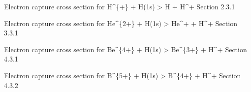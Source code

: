 \documentclass[letterpaper,10pt,english]{sphinxmanual}
\begin{document}

\begin{fulllineitems}
\label{\detokenize{aurora:aurora.janev_smith_rates.js_sigma_cx_n1_q1}}
Electron capture cross section for
H\textasciicircum{}\{+\} + H(1s) \textendash{}\textgreater{} H + H\textasciicircum{}+
Section 2.3.1

\end{fulllineitems}


\begin{fulllineitems}
\label{\detokenize{aurora:aurora.janev_smith_rates.js_sigma_cx_n1_q2}}
Electron capture cross section for
He\textasciicircum{}\{2+\} + H(1s) \textendash{}\textgreater{} He\textasciicircum{}+ + H\textasciicircum{}+
Section 3.3.1

\end{fulllineitems}


\begin{fulllineitems}
\label{\detokenize{aurora:aurora.janev_smith_rates.js_sigma_cx_n1_q4}}
Electron capture cross section for
Be\textasciicircum{}\{4+\} + H(1s) \textendash{}\textgreater{} Be\textasciicircum{}\{3+\} + H\textasciicircum{}+
Section 4.3.1

\end{fulllineitems}


\begin{fulllineitems}
\label{\detokenize{aurora:aurora.janev_smith_rates.js_sigma_cx_n1_q5}}
Electron capture cross section for
B\textasciicircum{}\{5+\} + H(1s) \textendash{}\textgreater{} B\textasciicircum{}\{4+\} + H\textasciicircum{}+
Section 4.3.2

\end{fulllineitems}
\end{document}
